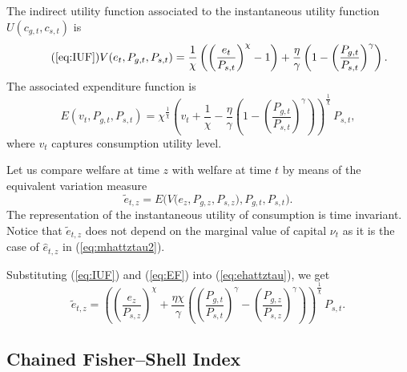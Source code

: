 \documentclass[12pt,a4paper]{article}
\newcommand{\red}[1]{\textcolor{red}{#1}} %
\begin{document}
\begin{appendices}
The indirect utility function associated to the instantaneous utility function $U(c_{g,t},c_{s,t})$ is
\begin{equation}\tag{\ref{eq:IUF}}
V(e_t, P_{g,t}, P_{s,t}) = \frac{1}{\chi} \left( \left( \frac{e_t}{P_{s,t}} \right)^\chi - 1 \right) +
\frac{\eta}{\gamma} \left( 1 - \left( \frac{P_{g,t}}{P_{s,t}} \right)^\gamma \right) .
\end{equation}
The associated expenditure function is %
\begin{equation}\label{eq:EF}
E(v_t, P_{g,t}, P_{s,t}) = 
\chi^{\frac{1}{\chi}}
\left( v_t  + \frac{1}{\chi} -
\frac{\eta}{\gamma} \left(1 - \left( \frac{P_{g,t}}{P_{s,t}} \right)^\gamma \right)\right)^{\frac{1}{\chi}}
\, P_{s,t},
\end{equation}
where $v_t$ captures consumption utility level. 

Let us compare welfare at time $z$ with welfare at time $t$ by means of the equivalent variation measure
\begin{equation}\label{eq:ehattztau}
\widetilde{e}_{t,z} = E\Big( V\big(e_{z}, P_{g,z}, P_{s,z}\big), P_{g,t}, P_{s,t}\Big).
\end{equation}
The representation of the instantaneous utility of consumption is time invariant. Notice that $\widetilde e_{t,z}$ does not depend on the marginal value of capital $\nu_t$ as it is the case of $\widehat  e_{t,z}$ in (\ref{eq:mhattztau2}).

Substituting (\ref{eq:IUF}) and (\ref{eq:EF}) into (\ref{eq:ehattztau}), we get
\[
\widetilde{e}_{t,z} = 
\left( \left( \frac{e_z}{P_{s,z}} \right)^\chi  +
\frac{\eta\chi}{\gamma} \left( \left( \frac{P_{g,t}}{P_{s,t}} \right)^\gamma - \left( \frac{P_{g,z}}{P_{s,z}} \right)^\gamma \right)   \right)^{\frac{1}{\chi}}
\, P_{s,t} .
\]

\subsection{Chained Fisher–Shell Index }


\end{appendices}
\end{document}
